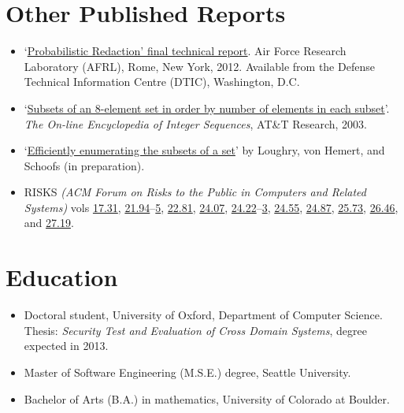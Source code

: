 \documentclass[12pt,twoside,letterpaper]{article}
\begin{document}
\section*{Other Published Reports}
\vspace{-2mm}
\begin{itemize}
	\item `\href{http://applied-math.org/Loughry2011.pdf}{Probabilistic Redaction' final
		technical report}. Air Force Research Laboratory (AFRL), Rome, New York, 2012.
		Available from the Defense Technical Information Centre (DTIC), Washington, D.C.

	\item `\href{http://oeis.org/A047869}{Subsets of an 8-element set in order by number
		of elements in each subset}'. \emph{The On-line Encyclopedia of Integer Sequences},
		AT\&T Research, 2003.

	\item `\href{http://www.applied-math.org/subset.pdf}{Efficiently enumerating the
		subsets of a set}' by Loughry, von Hemert, and Schoofs (in preparation).

    \item RISKS \emph{(ACM Forum on Risks to the Public in Computers
    and Related Systems)} vols \href{http://catless.ncl.ac.uk/Risks/17.31.html}{17.31},
	\href{http://catless.ncl.ac.uk/Risks/21.94.html}{21.94}--\href{http://catless.ncl.ac.uk/Risks/21.95.html}{5},
	\href{http://catless.ncl.ac.uk/Risks/21.81.html}{22.81},
	\href{http://catless.ncl.ac.uk/Risks/24.07.html}{24.07},
    \href{http://catless.ncl.ac.uk/Risks/24.22.html}{24.22}--\href{http://catless.ncl.ac.uk/Risks/24.23.html}{3},
	\href{http://catless.ncl.ac.uk/Risks/24.55.html}{24.55},
	\href{http://catless.ncl.ac.uk/Risks/24.87.html}{24.87},
	\href{http://catless.ncl.ac.uk/Risks/25.73.html}{25.73},
	\href{http://catless.ncl.ac.uk/Risks/26.46.html}{26.46},
	and \href{http://catless.ncl.ac.uk/Risks/27.19.html}{27.19}.
\end{itemize}

\vspace{-8mm}
\section*{Education}
\vspace{-2mm}
\begin{itemize}
    \item Doctoral student, University of Oxford, Department of Computer Science.
		Thesis: \emph{Security Test
		and Evaluation of Cross Domain Systems}, degree expected in 2013.

    \item Master of Software Engineering (M.S.E.) degree, Seattle University. %

    \item Bachelor of Arts (B.A.) in mathematics, University of Colorado at Boulder.
\end{itemize}
\end{document}
